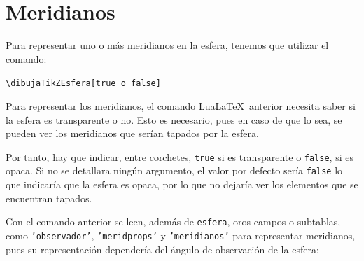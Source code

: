 %

\chapter{Meridianos}

Para representar uno o más meridianos en la esfera, tenemos que utilizar el comando:
\begin{center}
  {\small\texttt{\textbackslash dibujaTikZEsfera[true o false]}}
\end{center}
Para representar los meridianos, el comando Lua\LaTeX\ anterior necesita saber si la
esfera es transparente o no. Esto es necesario, pues en caso de que lo sea, se pueden
ver los meridianos que serían tapados por la esfera.

Por tanto, hay que indicar, entre corchetes, \texttt{true} si es transparente o
\texttt{false}, si es opaca.
Si no se detallara ningún argumento, el valor por defecto sería \texttt{false} lo que
indicaría que la esfera es opaca, por lo que no dejaría ver los elementos que se
encuentran tapados.

Con el comando anterior se leen, además de \texttt{esfera}, oros campos o subtablas,
como \texttt{'observador'}, \texttt{'meridprops'} y \texttt{'meridianos'} para representar
meridianos, pues su representación dependería del ángulo de observación de la esfera:

